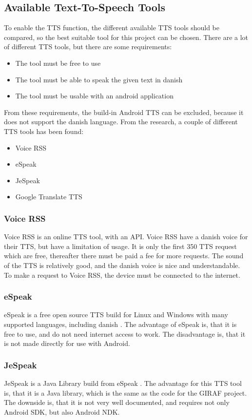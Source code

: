 \subsection{Available Text-To-Speech Tools}
\label{sec:ttstool}
To enable the TTS function, the different available TTS tools should be compared, so the best suitable tool for this project can be chosen.
There are a lot of different TTS tools, but there are some requirements:
\begin{itemize}
	\item The tool must be free to use
	\item The tool must be able to speak the given text in danish
	\item The tool must be usable with an android application
\end{itemize}
From these requirements, the build-in Android TTS can be excluded, because it does not support the danish language.
From the research, a couple of different TTS tools has been found:
\begin{itemize}
	\item Voice RSS
	\item eSpeak
	\item JeSpeak
	\item Google Translate TTS
\end{itemize}

\subsubsection{Voice RSS}
Voice RSS \citep{voicerss} is an online TTS tool, with an API. Voice RSS have a danish voice for their TTS, but have a limitation of usage. It is only the first 350 TTS request which are free, thereafter there must be paid a fee for more requests. The sound of the TTS is relatively good, and the danish voice is nice and understandable. To make a request to Voice RSS, the device must be connected to the internet.

\subsubsection{eSpeak}
eSpeak is a free open source TTS build for Linux and Windows with many supported languages, including danish \citep{espeak}. The advantage of eSpeak is, that it is free to use, and do not need internet access to work. The disadvantage is, that it is not made directly for use with Android. 

\subsubsection{JeSpeak}
JeSpeak is a Java Library build from eSpeak \citep{jespeak}. The advantage for this TTS tool is, that it is a Java library, which is the same as the code for the GIRAF project. The downside is, that it is not very well documented, and requires not only Android SDK, but also Android NDK.


